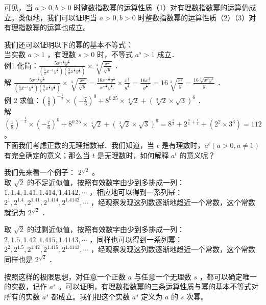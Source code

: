 \documentclass[10pt]{article}
\begin{document}
可见，当 \(a>0, b>0\) 时整数指数幂的运算性质（1）对有理数指数幂的运算仍成立。类似地，我们可以证明当 \(a>0, b>0\) 时整数指数幂的运算性质（2）（3）对有理指数幂的运算也成立。

我们还可以证明以下的幂的基本不等式：\\
当实数 \(a>1\) ，有理数 \(s>0\) 时，不等式 \(a^{s}>1\) 成立．\\
例1 化简：\(\frac{5 x^{-\frac{2}{3}} y^{\frac{1}{2}}}{\left(\frac{1}{2} x^{-1} y^{\frac{1}{2}}\right)\left(\frac{5}{8} x^{\frac{1}{3}} y^{\frac{1}{6}}\right)} \times \sqrt[3]{\frac{x^{2}}{\sqrt{y}}}\) ．\\
解 \(\frac{5 x^{-\frac{2}{3}} y^{\frac{1}{2}}}{\left(\frac{1}{2} x^{-1} y^{\frac{1}{2}}\right)\left(\frac{5}{8} x^{\frac{1}{3}} y^{\frac{1}{6}}\right)} \times \sqrt[3]{\frac{x^{2}}{\sqrt{y}}}=\frac{16 x^{-\frac{2}{3}} y^{\frac{1}{2}}}{x^{-\frac{2}{3}} y^{\frac{2}{3}}} \times \frac{x^{\frac{2}{3}}}{y^{\frac{1}{6}}}=\frac{16 x^{\frac{2}{3}}}{y^{\frac{1}{3}}}=16 \sqrt[3]{\frac{x^{2}}{y}}=\frac{16 \sqrt[3]{x^{2} y^{2}}}{y}\) ．\\
例 2 求值：\(\left(\frac{1}{8}\right)^{-\frac{1}{3}} \times\left(-\frac{7}{6}\right)^{0}+8^{0.25} \times \sqrt[4]{2}+(\sqrt[3]{2} \times \sqrt{3})^{6}\) ．\\
解 \(\left(\frac{1}{8}\right)^{-\frac{1}{3}} \times\left(-\frac{7}{6}\right)^{0}+8^{0.25} \times \sqrt[4]{2}+(\sqrt[3]{2} \times \sqrt{3})^{6}=8^{\frac{1}{3}}+2^{\frac{3}{4}+\frac{1}{4}}+\left(2^{2} \times 3^{3}\right)=112\) 。\\
下面我们考虑正数的无理指数幂．我们知道，当 \(t\) 是有理数时，\(a^{t}(a>0, a \neq 1)\) 有完全确定的意义；那么当 \(t\) 是无理数时，如何解释 \(a^{t}\) 的意义呢？

我们先来看一个例子： \(2^{\sqrt{2}}\) 。\\
取 \(\sqrt{2}\) 的不足近似值，按照有效数字由少到多排成一列： \(1,1.4,1.41,1.414,1.4142, \cdots\) ，相应地可以得到一系列幂： \(2^{1}, 2^{1.4}, 2^{1.41}, 2^{1.414}, 2^{1.4142}, \cdots\) ，经观察发现这列数逐渐地趋近一个常数，这个常数就记为 \(2^{\sqrt{2}}\) ．

取 \(\sqrt{2}\) 的过剩近似值，按照有效数字由少到多排成一列： \(2,1.5,1.42,1.415,1.4143, \cdots\) ，同样也可以得到一系列幂： \(2^{2}, 2^{1.5}, 2^{1.42}, 2^{1.415}, 2^{1.4143}, \cdots\) ，经观察发现这列数逐渐地趋近一个常数，这个常数同样也是 \(2^{\sqrt{2}}\) ．

按照这样的极限思想，对任意一个正数 \(a\) 与任意一个无理数 \(s\) ，都可以确定唯一的实数，记作 \(a^{s}\) 。可以证明，有理数指数幂的三条运算性质与幂的基本不等式对所有的实数 \(a^{s}\) 都成立。我们把这个实数 \(a^{s}\) 定义为 \(a\) 的 \(s\) 次幂。
\end{document}
